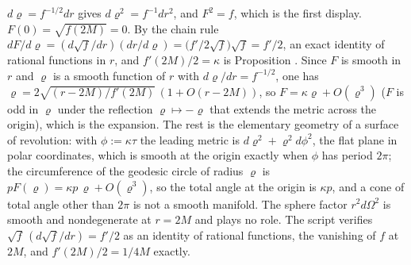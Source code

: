 $d\varrho = f^{-1/2}dr$ gives $d\varrho^{2} = f^{-1}dr^{2}$, and $F^{2} = f$, which is the first display. $F(0) = \sqrt{f(2M)} = 0$. By the chain rule $dF/d\varrho = (d\sqrt f/dr)(dr/d\varrho) = \bigl(f'/2\sqrt f\bigr)\sqrt f = f'/2$, an exact identity of rational functions in $r$, and $f'(2M)/2 = \kappa$ is Proposition . Since $F$ is smooth in $r$ and $\varrho$ is a smooth function of $r$ with $d\varrho/dr = f^{-1/2}$, one has $\varrho = 2\sqrt{(r - 2M)/f'(2M)}\,(1 + O(r - 2M))$, so $F = \kappa\varrho + O(\varrho^{3})$ ($F$ is odd in $\varrho$ under the reflection $\varrho \mapsto -\varrho$ that extends the metric across the origin), which is the expansion. The rest is the elementary geometry of a surface of revolution: with $\phi := \kappa\tau$ the leading metric is $d\varrho^{2} + \varrho^{2}d\phi^{2}$, the flat plane in polar coordinates, which is smooth at the origin exactly when $\phi$ has period $2\pi$; the circumference of the geodesic circle of radius $\varrho$ is $pF(\varrho) = \kappa p\,\varrho + O(\varrho^{3})$, so the total angle at the origin is $\kappa p$, and a cone of total angle other than $2\pi$ is not a smooth manifold. The sphere factor $r^{2}d\Omega^{2}$ is smooth and nondegenerate at $r = 2M$ and plays no role. The script verifies $\sqrt f\,(d\sqrt f/dr) = f'/2$ as an identity of rational functions, the vanishing of $f$ at $2M$, and $f'(2M)/2 = 1/4M$ exactly.
